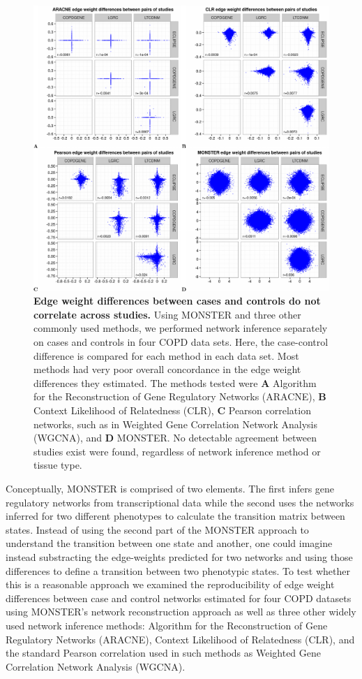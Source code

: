 \begin{figure}[h]
\includegraphics[width=1\linewidth]{figures/SupportingFigure3}
\caption{\textbf{Edge weight differences between cases and controls do not correlate across studies.} Using MONSTER and three other commonly used methods, we performed network inference separately on cases and controls in four  COPD data sets. Here, the case-control difference is compared for each method in each data set. Most methods had very poor overall concordance in the edge weight differences they estimated. The methods tested were \textbf{A} Algorithm for the Reconstruction of Gene Regulatory Networks (ARACNE), \textbf{B} Context Likelihood of Relatedness (CLR), \textbf{C} Pearson correlation networks, such as in Weighted Gene Correlation Network Analysis (WGCNA), and \textbf{D} MONSTER. No detectable agreement between studies exist were found, regardless of network inference method or tissue type.} \label{fig:Supplement NI edgeweight plots}
\end{figure}

Conceptually, MONSTER is comprised of two elements. The first infers gene regulatory networks from transcriptional data while the second uses the networks inferred for two different phenotypes to calculate the transition matrix between states. Instead of using the second part of the MONSTER approach to understand the transition between one state and another, one could imagine instead substracting the edge-weights predicted for two networks and using those differences to define a transition between two phenotypic states. To test whether this is a reasonable approach we examined the reproducibility of edge weight differences between case and control networks estimated for four COPD datasets using MONSTER's network reconstruction approach as well as three other widely used network inference methods: Algorithm for the Reconstruction of Gene Regulatory Networks (ARACNE), Context Likelihood of Relatedness (CLR), and the standard Pearson correlation used in such methods as Weighted Gene Correlation Network Analysis (WGCNA). 

